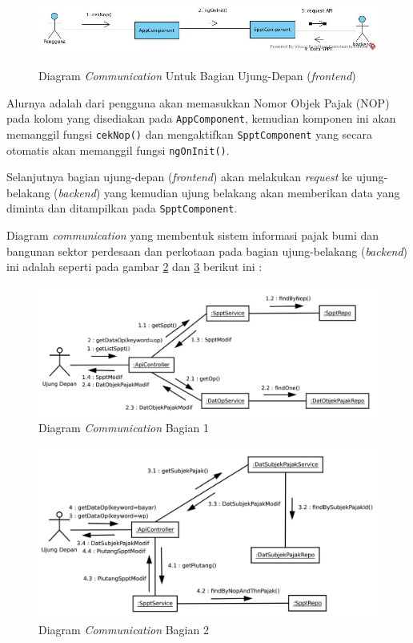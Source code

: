 \begin{figure}[H]
	\centering
	\includegraphics[width=1\textwidth]{./resources/uml/comm-dia-fe}
	\label{fig:comm-dia-fe}
	\caption{Diagram \textit{Communication} Untuk Bagian Ujung-Depan (\textit{frontend})}
\end{figure}

Alurnya adalah dari pengguna akan memasukkan Nomor Objek Pajak (NOP) pada kolom yang disediakan pada \texttt{AppComponent}, kemudian komponen ini akan memanggil fungsi \texttt{cekNop()} dan mengaktifkan \texttt{SpptComponent} yang secara otomatis akan memanggil fungsi \texttt{ngOnInit()}.

Selanjutnya bagian ujung-depan (\textit{frontend}) akan melakukan \textit{request} ke ujung-belakang (\textit{backend}) yang kemudian ujung belakang akan memberikan data yang diminta dan ditampilkan pada \texttt{SpptComponent}.

Diagram \textit{communication} yang membentuk sistem informasi pajak bumi dan bangunan sektor perdesaan dan perkotaan pada bagian ujung-belakang (\textit{backend}) ini adalah seperti pada gambar \ref{fig:comm-dia-be-1} dan \ref{fig:comm-dia-be-2} berikut ini :

\begin{figure}[H]
	\centering
	\includegraphics[width=1\textwidth]{./resources/uml/comm-dia-1}
	\caption{Diagram \textit{Communication} Bagian 1}
	\label{fig:comm-dia-be-1}
\end{figure}

\begin{figure}[H]
	\centering
	\includegraphics[width=1\textwidth]{./resources/uml/comm-dia-2}
	\caption{Diagram \textit{Communication} Bagian 2}
	\label{fig:comm-dia-be-2}
\end{figure}

